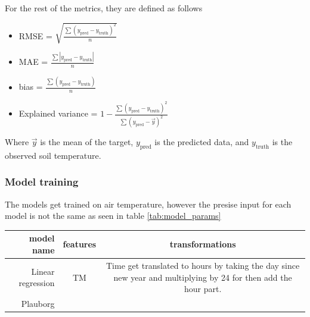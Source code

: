 For the rest of the metrics, they are defined as follows
\begin{itemize}
	\item RMSE = $\sqrt{\frac{\sum (y_{\text{pred}} - y_{\text{truth}})^2}{n}}$
	\item MAE = $\frac{\sum \left| y_{\text{pred}} - y_{\text{truth}}\right|}{n}$
	\item bias = $\frac{\sum ( y_{\text{pred}} - y_{\text{truth}})}{n}$
	\item Explained variance = $1-\frac{\sum (y_{\text{pred}} - y_{\text{truth}})^2}{\sum (y_{\text{pred}} - \vec{y})^2}$
\end{itemize}

Where $\vec{y}$ is the mean of the target, $y_{\text{pred}}$ is the predicted data, and $y_{\text{truth}}$ is the observed soil temperature.

\subsubsection{Model training}

The models get trained on air temperature, however the presise input for each model is not the same as seen in table \ref{tab:model_params}

\begin{table}
	\begin{tabular}{|r|c|c|}
		model name & features & transformations \\\hline
		Linear regression & TM & Time get translated to hours by taking the day since new year and multiplying by 24 for then add the hour part. \\
		Plauborg & &
	\end{tabular}
\end{table}




